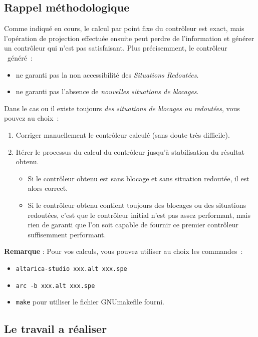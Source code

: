 \subsection{Rappel méthodologique}
Comme indiqué en cours, le calcul par point fixe du contrôleur est exact, mais l'opération de projection effectuée ensuite peut perdre de l'information et générer un contrôleur qui n'est pas satisfaisant. Plus précisemment, le contrôleur \altarica\ généré~:
\begin{itemize}
\item ne garanti pas la non accessibilité des \emph{Situations Redoutées}.
\item ne garanti pas l'absence de \emph{nouvelles situations de blocages}.
\end{itemize}

Dans le cas ou il existe toujours \emph{des situations de blocages ou redoutées}, vous pouvez au choix~:
\begin{enumerate}
\item Corriger manuellement le contrôleur calculé (sans doute très difficile).
\item Itérer le processus du calcul du contrôleur jusqu'à stabilisation du résultat obtenu. 
  \begin{itemize}
  \item Si le contrôleur obtenu est sans blocage et sans situation redoutée, il est alors correct.
  \item Si le contrôleur obtenu contient toujours des blocages ou des situations redoutées, c'est que le contrôleur initial n'est pas assez performant, mais rien de garanti que l'on soit capable de fournir ce premier contrôleur suffisemment performant.
  \end{itemize}
\end{enumerate}

{\bf Remarque} : Pour vos calculs, vous pouvez utiliser au choix les commandes~:
\begin{itemize}
\item {\tt altarica-studio xxx.alt xxx.spe}
\item {\tt arc -b xxx.alt xxx.spe}
\item {\tt make} pour utiliser le fichier GNUmakefile fourni.
\end{itemize}

\subsection{Le travail a réaliser}

